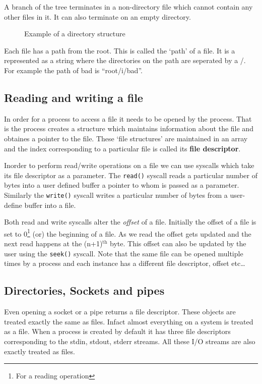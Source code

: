 \documentclass[12pt]{article}
\begin{document}
A branch of the tree terminates in a non-directory file which cannot contain any other files in it. It can also terminate on an empty directory. 
\begin{figure}[H]
    \centering
{}

  \caption{Example of a directory structure}
\end{figure}
Each file has a path from the root. This is called the `path' of a file. It is a represented as a string where the directories on the path are seperated by a /. 
For example the path of bad is ``root/i/bad''.

\subsection{Reading and writing a file}
In order for a process to access a file it needs to be opened by the process. That is the process creates a structure which maintains information about the file and obtaines a pointer to the file. These `file structures' are maintained in an array and the index corresponding to a particular file is called its \textbf{file descriptor}.

Inorder to perform read/write operations on a file we can use syscalls which take its file descriptor as a parameter. The \texttt{read()} syscall reads a particular number of bytes into a user defined buffer a pointer to whom is passed as a parameter. Similarly the \texttt{write()} syscall 
writes a particular number of bytes from a user-define buffer into a file.

Both read and write syscalls alter the \textit{offset} of a file. Initially the offset of a file is set to 0\footnote{For a reading operation} (or) the beginning of a file. As we read the offset gets updated and the next read happens at the (n+1)\(^\text{th}\) byte. This offset can also be updated by the user using the \texttt{seek()} syscall. 
Note that the same file can be opened multiple times by a process and each instance has a different file descriptor, offset etc\dots

\subsection{Directories, Sockets and pipes}
Even opening a socket or a pipe returns a file descriptor. These objects are treated exactly the same as files. Infact almost everything on a system is treated as a file. 
When a process is created by default it has three file descriptors corresponding to the stdin, stdout, stderr streams. All these I/O streams are also exactly treated as files. 
\end{document}
